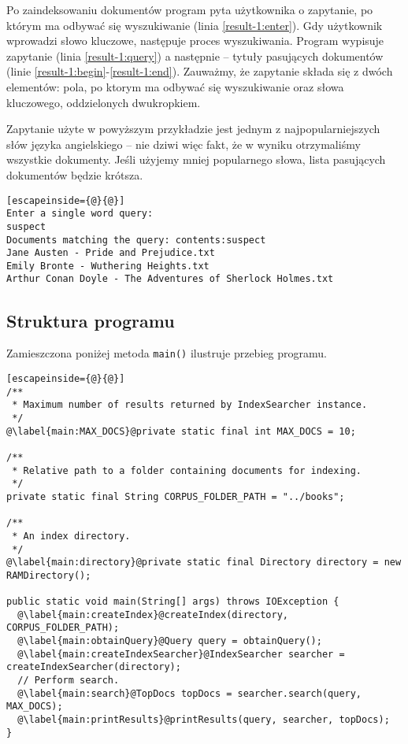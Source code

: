Po zaindeksowaniu dokumentów program pyta użytkownika o zapytanie, po którym ma odbywać się wyszukiwanie (linia \ref{result-1:enter}). Gdy użytkownik wprowadzi słowo kluczowe, następuje proces wyszukiwania. Program wypisuje zapytanie (linia \ref{result-1:query}) a następnie -- tytuły pasujących dokumentów (linie \ref{result-1:begin}-\ref{result-1:end}). Zauważmy, że zapytanie składa się z dwóch elementów: pola, po ktorym ma odbywać się wyszukiwanie oraz słowa kluczowego, oddzielonych dwukropkiem.

Zapytanie użyte w powyższym przykładzie jest jednym z najpopularniejszych słów języka angielskiego -- nie dziwi więc fakt, że w wyniku otrzymaliśmy wszystkie dokumenty. Jeśli użyjemy mniej popularnego słowa, lista pasujących dokumentów będzie krótsza.

\begin{lstlisting}[escapeinside={@}{@}]
Enter a single word query:
suspect
Documents matching the query: contents:suspect
Jane Austen - Pride and Prejudice.txt
Emily Bronte - Wuthering Heights.txt
Arthur Conan Doyle - The Adventures of Sherlock Holmes.txt
\end{lstlisting}

\subsection{Struktura programu}

Zamieszczona poniżej metoda \texttt{main()} ilustruje przebieg programu.

\begin{lstlisting}[escapeinside={@}{@}]
/**
 * Maximum number of results returned by IndexSearcher instance.
 */
@\label{main:MAX_DOCS}@private static final int MAX_DOCS = 10;

/**
 * Relative path to a folder containing documents for indexing.
 */
private static final String CORPUS_FOLDER_PATH = "../books";

/**
 * An index directory.
 */
@\label{main:directory}@private static final Directory directory = new RAMDirectory();

public static void main(String[] args) throws IOException {
  @\label{main:createIndex}@createIndex(directory, CORPUS_FOLDER_PATH);
  @\label{main:obtainQuery}@Query query = obtainQuery();
  @\label{main:createIndexSearcher}@IndexSearcher searcher = createIndexSearcher(directory);
  // Perform search.
  @\label{main:search}@TopDocs topDocs = searcher.search(query, MAX_DOCS);
  @\label{main:printResults}@printResults(query, searcher, topDocs);
}
\end{lstlisting}

